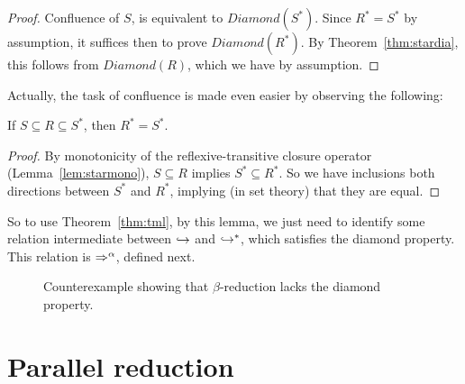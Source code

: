 \begin{proof}
  Confluence
  of $S$, is equivalent to $\textit{Diamond}(S^*)$.  Since $R^* = S^*$ by assumption, it suffices
  then to prove $\textit{Diamond}(R^*)$.  By Theorem~\ref{thm:stardia}, this follows
  from $\textit{Diamond}(R)$, which we have by assumption.
\end{proof}

Actually, the task of confluence is made even easier by observing the following:
\begin{lemma}
  If $S \subseteq R \subseteq S^*$, then $R^* = S^*$.
\end{lemma}
\begin{proof}
  By monotonicity of the reflexive-transitive closure operator (Lemma~\ref{lem:starmono}),
  $S \subseteq R$ implies $S^* \subseteq R^*$.  So we have inclusions both directions
  between $S^*$ and $R^*$, implying (in set theory) that they are equal.
  \end{proof}

\noindent So to use Theorem~\ref{thm:tml}, by this lemma, we just need to identify some relation
intermediate between $\hookrightarrow$ and $\hookrightarrow^*$, which satisfies the diamond property.  This relation
is $\Rightarrow^\alpha$, defined next.

\begin{figure}

  \begin{center}
    \end{center}

\caption{Counterexample showing that $\beta$-reduction lacks the diamond property.}
\label{fig:betanodia}

\end{figure}

\section{Parallel reduction}

